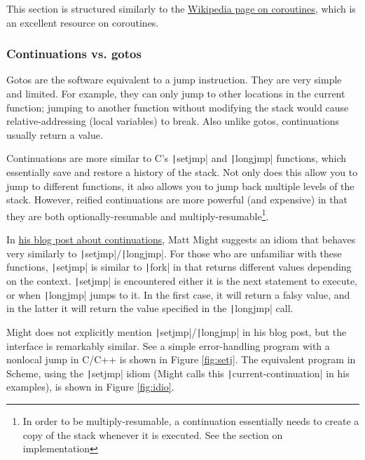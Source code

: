 \documentclass[]{article}
\begin{document}
This section is structured similarly to the \href{https://en.wikipedia.org/wiki/Coroutine}{Wikipedia page on coroutines}, which is an excellent resource on coroutines.

\subsubsection{Continuations vs. gotos}
\label{sec:goto}

Gotos are the software equivalent to a jump instruction. They are very simple and limited. For example, they can only jump to other locations in the current function; jumping to another function without modifying the stack would cause relative-addressing (local variables) to break. Also unlike gotos, continuations usually return a value.

Continuations are more similar to C's \texttt|setjmp| and \texttt|longjmp| functions, which essentially save and restore a history of the stack. Not only does this allow you to jump to different functions, it also allows you to jump back multiple levels of the stack. However, reified continuations are more powerful (and expensive) in that they are both optionally-resumable and multiply-resumable\footnote{In order to be multiply-resumable, a continuation essentially needs to create a copy of the stack whenever it is executed. See the section on implementation}.

In \href{https://matt.might.net/articles/programming-with-continuations--exceptions-backtracking-search-threads-generators-coroutines/}{his blog post about continuations}, Matt Might suggests an idiom that behaves very similarly to \texttt|setjmp|/\texttt|longjmp|. For those who are unfamiliar with these functions, \texttt|setjmp| is similar to \texttt|fork| in that returns different values depending on the context. \texttt|setjmp| is encountered either it is the next statement to execute, or when \texttt|longjmp| jumps to it. In the first case, it will return a falsy value, and in the latter it will return the value specified in the \texttt|longjmp| call.

Might does not explicitly mention \texttt|setjmp|/\texttt|longjmp| in his blog post, but the interface is remarkably similar. See a simple error-handling program with a nonlocal jump in C/C++ is shown in Figure \ref{fig:setj}. The equivalent program in Scheme, using the \texttt|setjmp| idiom (Might calls this \texttt|current-continuation| in his examples), is shown in Figure \ref{fig:idio}.
\end{document}
